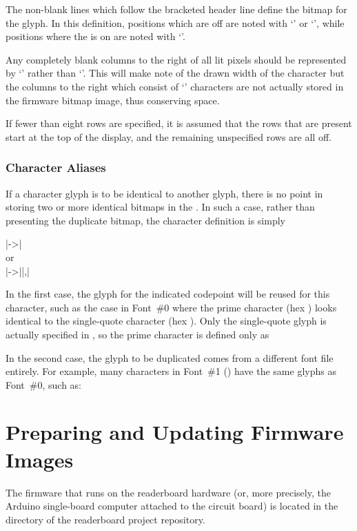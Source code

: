 The non-blank lines which follow the bracketed header line define
the bitmap for the glyph. In this definition, positions which are off
are noted with `' or `\z{|}', while positions where the  is
on are noted with `'.

Any completely blank columns to the right of all lit pixels should be
represented by `\z{|}' rather than `'. This will make note of the drawn
width of the character but the columns to the right which consist of `\z{|}'
characters are not actually stored in the firmware bitmap image, thus conserving
 space.

If fewer than eight rows are specified, it is assumed that the rows that are present
start at the top of the display, and the remaining unspecified rows are all off.

\subsection{Character Aliases}
If a character glyph is to be identical to another glyph, there is no point
in storing two or more identical bitmaps in the . In such a case,
rather than presenting the duplicate bitmap, the character definition
is simply
\begin{center}
	\begin{Coding}
		|->|\\
		or\\
		|->||,|
	\end{Coding}
\end{center}
In the first case, the glyph for the indicated codepoint will be reused for this character,
such as the case in Font~\#0 where the prime character (hex ) looks identical to
the single-quote character (hex ). Only the single-quote glyph is actually specified
in , so the prime character is defined only as

In the second case, the glyph to be duplicated comes from a different font file entirely.
For example, many characters in Font~\#1 () have the same glyphs
as Font~\#0, such as:

\chapter{Preparing and Updating Firmware Images}
The firmware that runs on the readerboard hardware (or, more precisely, the Arduino single-board
computer attached to the circuit board) is located in the  directory of the
readerboard project repository.

